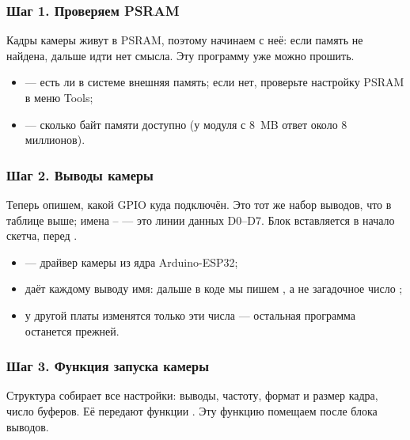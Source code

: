 \subsubsection{Шаг 1. Проверяем PSRAM}

Кадры камеры живут в PSRAM, поэтому начинаем с неё: если память не найдена, дальше идти нет смысла.
Эту программу уже можно прошить.


\begin{itemize}[leftmargin=*]
  \item {} --- есть ли в системе внешняя память; если нет, проверьте настройку \textsf{PSRAM} в меню \textsf{Tools};
  \item {} --- сколько байт памяти доступно (у модуля с \SI{8}{MB} ответ около 8 миллионов).
\end{itemize}

\subsubsection{Шаг 2. Выводы камеры}

Теперь опишем, какой GPIO куда подключён. Это тот же набор выводов, что в таблице выше; имена
-- --- это линии данных D0--D7. Блок вставляется в начало скетча, перед .


\begin{itemize}[leftmargin=*]
  \item {} --- драйвер камеры из ядра Arduino-ESP32;
  \item {} даёт каждому выводу имя: дальше в коде мы пишем , а не загадочное число ;
  \item у другой платы изменятся только эти числа --- остальная программа останется прежней.
\end{itemize}

\subsubsection{Шаг 3. Функция запуска камеры}

Структура  собирает все настройки: выводы, частоту, формат и размер кадра, число
буферов. Её передают функции . Эту функцию помещаем после блока выводов.

